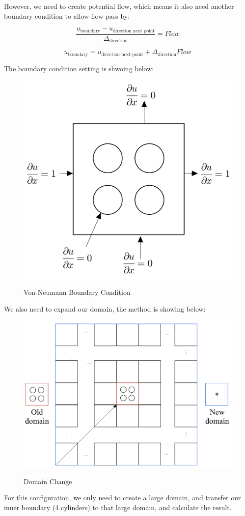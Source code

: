 \documentclass[12pt]{article}
\begin{document}
However, we need to create potential flow, which means it also need another boundary 
condition to allow flow pass by: 


\[
\frac{u_{\text{boundary}} - u_{\text{direction next point}}}{\Delta_{\text{direction}}} = Flow
\]

\[
u_{\text{boundary}} = u_{\text{direction next point}} + \Delta_{\text{direction}} Flow
\]


The boundary condition setting is shwoing below:

\begin{figure}[H]
    \centering
    \includegraphics[width=0.5  \textwidth]{BoundaryVon.jpg}
    \label{BoundaryVon.jpg}
    \caption{Von-Neumann Boundary Condition}                                      
\end{figure}

We also need to expand our domain, the method is showing below:



\begin{figure}[H]
    \centering
    \includegraphics[width=0.7  \textwidth]{largedomain.jpg}
    \label{largedomain.jpg}
    \caption{Domain Change}                                      
\end{figure}

For this configuration, we only need to create a large domain, and transfer our 
inner boundary (4 cylinders) to that large domain, and calculate the result.
\end{document}
